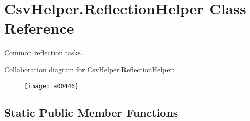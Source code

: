 \hypertarget{a00142}{\section{Csv\-Helper.\-Reflection\-Helper Class Reference}
\label{a00142}
}


Common reflection tasks.  




Collaboration diagram for Csv\-Helper.\-Reflection\-Helper\-:
\nopagebreak
\begin{figure}[H]
\begin{center}
\leavevmode
\texttt{[image: a00446]}
\end{center}
\end{figure}
\subsection*{Static Public Member Functions}
